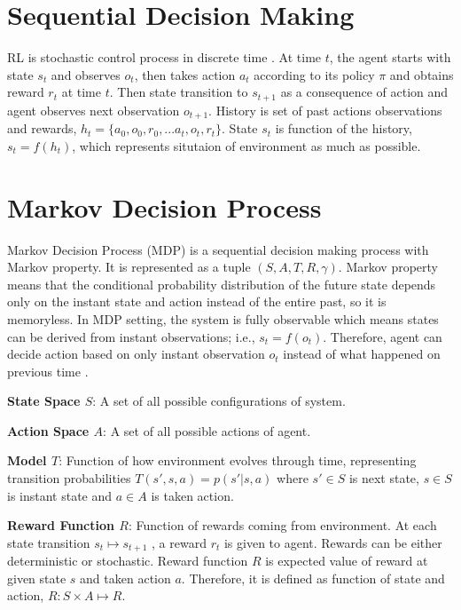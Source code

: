 \section{Sequential Decision Making}

RL is stochastic control process in discrete time \cite{sutton_reinforcement_1998}.
At time $t$, the agent starts with state $s_t$ and observes $o_t$, then takes action $a_t$ according to its policy $\pi$ and obtains reward $r_t$ at time $t$. Then state transition to $s_{t+1}$ as a consequence of action and agent observes next observation $o_{t+1}$. History is set of past actions observations and rewards, $h_t=\{ a_0, o_0, r_0, ... a_t, o_t, r_t\}$. State $s_t$ is function of the history, $s_t=f(h_t)$, which represents situtaion of environment as much as possible.

\section{Markov Decision Process}
\label{sec:mdp}

Markov Decision Process (MDP) is a sequential decision making process with Markov property. It is represented as a tuple $(S,A,T,R,\gamma)$. Markov property means that the conditional probability distribution of the future state depends only on the instant state and action instead of the entire past, so it is memoryless. In MDP setting, the system is fully observable which means states can be derived from instant observations; i.e., $s_t=f(o_t)$. Therefore, agent can decide action based on only instant observation $o_t$ instead of what happened on previous time \cite{francois-lavet_introduction_2018}.

\textbf{State Space $S$}: A set of all possible configurations of system. 

\textbf{Action Space $A$}: A set of all possible actions of agent.

\textbf{Model $T$}: Function of how environment evolves through time, representing transition probabilities $T(s',s,a) = p(s'|s,a)$ where $s' \in S$ is next state, $s \in S$ is instant state and $a \in A$ is taken action. 

\textbf{Reward Function $R$}: Function of rewards coming from environment. At each state transition $s_t \mapsto s_{t+1}$ , a reward $r_t$ is given to agent. Rewards can be either deterministic or stochastic. Reward function $R$ is expected value of reward at given state $s$ and taken action $a$. Therefore, it is defined as function of state and action, $R \colon S \times A \mapsto R$.


